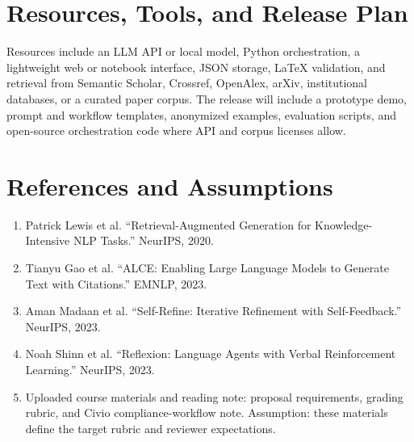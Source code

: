 \documentclass[11pt]{article}
\begin{document}
\section*{Resources, Tools, and Release Plan}
Resources include an LLM API or local model, Python orchestration, a lightweight web or notebook interface, JSON storage, LaTeX validation, and retrieval from Semantic Scholar, Crossref, OpenAlex, arXiv, institutional databases, or a curated paper corpus. The release will include a prototype demo, prompt and workflow templates, anonymized examples, evaluation scripts, and open-source orchestration code where API and corpus licenses allow.

\section*{References and Assumptions}
\begin{enumerate}
\item Patrick Lewis et al. ``Retrieval-Augmented Generation for Knowledge-Intensive NLP Tasks.'' NeurIPS, 2020.
\item Tianyu Gao et al. ``ALCE: Enabling Large Language Models to Generate Text with Citations.'' EMNLP, 2023.
\item Aman Madaan et al. ``Self-Refine: Iterative Refinement with Self-Feedback.'' NeurIPS, 2023.
\item Noah Shinn et al. ``Reflexion: Language Agents with Verbal Reinforcement Learning.'' NeurIPS, 2023.
\item Uploaded course materials and reading note: proposal requirements, grading rubric, and Civio compliance-workflow note. Assumption: these materials define the target rubric and reviewer expectations.
\end{enumerate}
\end{document}
